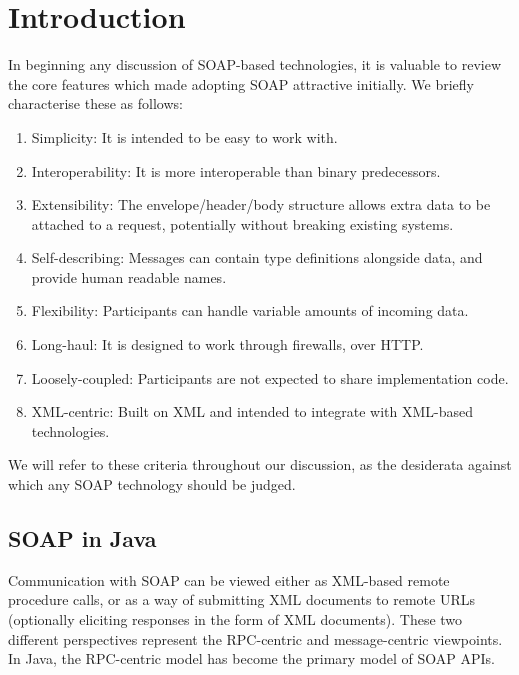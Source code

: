 \section{Introduction}
\label{introduction}

In beginning any discussion of SOAP-based technologies, it is 
valuable to review the core features which made adopting SOAP
attractive initially. We briefly characterise these as follows:

\begin{enumerate}
\item Simplicity: It is intended to be easy to work with.

\item Interoperability: It is more interoperable than binary
predecessors.

\item Extensibility: The envelope/header/body structure
allows extra data to be attached to a request, potentially without
breaking existing systems.

\item Self-describing: Messages can contain type definitions
alongside data, and provide human readable names.

\item Flexibility: Participants can handle variable amounts
of incoming data.

\item Long-haul: It is designed to work through firewalls,
over HTTP.

\item Loosely-coupled: Participants are not expected to share
implementation code.

\item XML-centric: Built on XML and intended to integrate with
XML-based technologies.

\end{enumerate}

We will refer to these criteria throughout our discussion, as the
desiderata against which any SOAP technology should be judged.

\subsection{SOAP in Java}
\label{intro:java}

Communication with SOAP can be viewed either as XML-based remote
procedure calls, or as a way of submitting XML documents to remote
URLs (optionally eliciting responses in the form of XML
documents). These two different perspectives represent the RPC-centric
and message-centric viewpoints. In Java, the RPC-centric model has
become the primary model of SOAP APIs.

